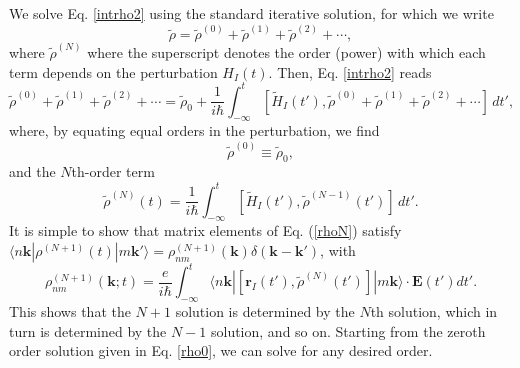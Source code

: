 We solve Eq. \eqref{intrho2} using the standard iterative
solution, for which we write
\begin{equation}\label{rhop}
\tilde{\rho}
= \tilde{\rho}^{(0)}
+ \tilde{\rho}^{(1)}
+ \tilde{\rho}^{(2)}
+ \cdots,
\end{equation}
where $\tilde{\rho}^{(N)}$ where the superscript denotes the order (power) with
which each term depends on the perturbation $H_{I}(t)$. Then, Eq.
\eqref{intrho2} reads
\begin{equation}\label{intrho3}
  \tilde{\rho}^{(0)} 
+ \tilde{\rho}^{(1)} 
+ \tilde{\rho}^{(2)} 
+ \cdots
= \tilde{\rho}_{0}
+ \frac{1}{i\hbar}\int_{-\infty}^{t} 
  \left[
  \tilde{H}_{I}(t'),\tilde{\rho}^{(0)}+\tilde{\rho}^{(1)}+\tilde{\rho}^{(2)}
  + \cdots
  \right]\,dt',
\end{equation}
where, by equating equal orders in the perturbation, we find
\begin{equation}\label{rho0}
\tilde{\rho}^{(0)}\equiv\tilde{\rho}_{0},
\end{equation}
and the $N$th-order term
\begin{equation}\label{rhoN}
\tilde{\rho}^{(N)}(t)=
\frac{1}{i\hbar}
\int_{-\infty}^{t}
\left[\tilde{H}_{I}(t'),\tilde{\rho}^{(N-1)}(t')\right]\,dt'.
\end{equation}
It is simple to show that matrix elements of Eq. (\ref{rhoN}) satisfy 
$\langle n\mathbf{k}| \rho^{(N+1)}(t) |m\mathbf{k}'\rangle =
\rho^{(N+1)}_{nm}(\mathbf{k})\delta(\mathbf{k}-\mathbf{k}')$, with
\begin{equation}\label{rtilde}
\rho^{(N+1)}_{nm}(\mathbf{k};t)
= \frac{e}{i\hbar}\int_{-\infty}^t
\langle n\mathbf{k}|
\left[\mathbf{r}_{I}(t'),\tilde{\rho}^{(N)}(t')\right]
|m\mathbf{k}\rangle
\cdot\mathbf{E}(t')dt'.
\end{equation}
This shows that the $N + 1$ solution is determined by the $N$th solution, which
in turn is determined by the $N - 1$ solution, and so on. Starting from the
zeroth order solution given in Eq. \eqref{rho0}, we can solve for any desired
order.

